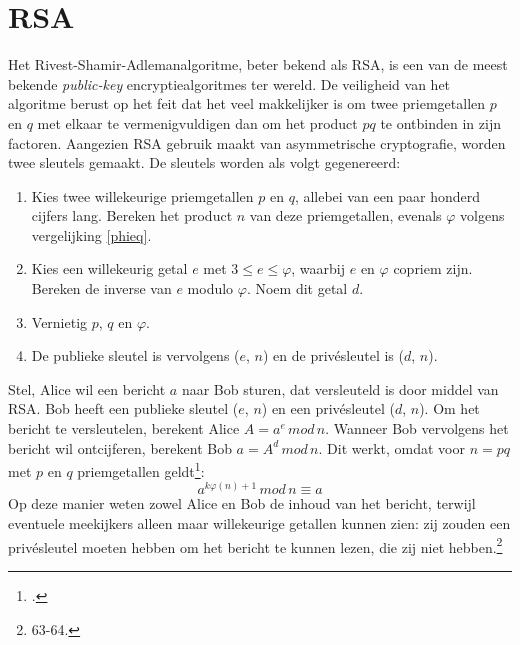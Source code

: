 \documentclass{report} %
\begin{document}
\section{RSA}
Het Rivest-Shamir-Adlemanalgoritme, beter bekend als RSA, is een van de meest bekende \textit{public-key} encryptiealgoritmes ter wereld. De veiligheid van het algoritme berust op het feit dat het veel makkelijker is om twee priemgetallen $p$ en $q$ met elkaar te vermenigvuldigen dan om het product $pq$ te ontbinden in zijn factoren. Aangezien RSA gebruik maakt van asymmetrische cryptografie, worden twee sleutels gemaakt. De sleutels worden als volgt gegenereerd:
\begin{enumerate}
\item Kies twee willekeurige priemgetallen $p$ en $q$, allebei van een paar honderd cijfers lang. Bereken het product $n$ van deze priemgetallen, evenals $\varphi$ volgens vergelijking \ref{phieq}. 
\item Kies een willekeurig getal $e$ met $3\leq e \leq \varphi$, waarbij $e$ en $\varphi$ copriem zijn. Bereken de inverse van $e$ modulo $\varphi$. Noem dit getal $d$.
\item Vernietig $p$, $q$ en $\varphi$.
\item De publieke sleutel is vervolgens ($e$, $n$) en de privésleutel is ($d$, $n$).
\end{enumerate}
Stel, Alice wil een bericht $a$ naar Bob sturen, dat versleuteld is door middel van RSA. Bob heeft een publieke sleutel ($e$, $n$) en een privésleutel ($d$, $n$). Om het bericht te versleutelen, berekent Alice $A = a^e\, mod\, n$. Wanneer Bob vervolgens het bericht wil ontcijferen, berekent Bob $a = A^d\, mod\, n$. Dit werkt, omdat voor $n=pq$ met $p$ en $q$ priemgetallen geldt\footnote{\cite{hellman_crypto}.}: 
\begin{equation}
    a^{k\varphi(n)+1}\, mod\, n \equiv a
\end{equation} 
Op deze manier weten zowel Alice en Bob de inhoud van het bericht, terwijl eventuele meekijkers alleen maar willekeurige getallen kunnen zien: zij zouden een privésleutel moeten hebben om het bericht te kunnen lezen, die zij niet hebben.\footnote{\cite{cryptografie} 63-64.}
\end{document}
